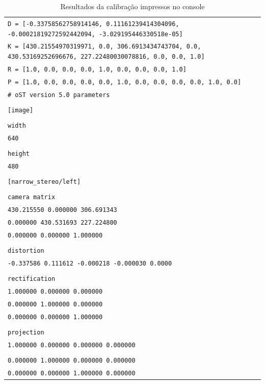 \begin{table}[!ht]\label{tb:5}
\begin{tabular}{| p{\textwidth}|}
\hline
\texttt{D = [-0.33758562758914146, 0.11161239414304096, -0.00021819272592442094, -3.029195446330518e-05]}\\
 \texttt{K = [430.21554970319971, 0.0, 306.6913434743704, 0.0, 430.53169252696676, 227.22480030078816, 0.0, 0.0, 1.0{]}}\\
\texttt{R = [1.0, 0.0, 0.0, 0.0, 1.0, 0.0, 0.0, 0.0, 1.0{]}}\\
\texttt{P = [1.0, 0.0, 0.0, 0.0, 0.0, 1.0, 0.0, 0.0, 0.0, 0.0, 1.0, 0.0]}\\
 \texttt{\# oST version 5.0 parameters}\\
\\
 \texttt{[image]}\\
\\
 \texttt{width}\\
 \texttt{640}\\
\\
 \texttt{height}\\
 \texttt{480}\\
\\
 \texttt{[narrow\_stereo/left]}\\
\\
 \texttt{camera matrix}\\
 \texttt{430.215550 0.000000 306.691343}\\
 \texttt{0.000000 430.531693 227.224800}\\
 \texttt{0.000000 0.000000 1.000000}\\
\\
 \texttt{distortion}\\
 \texttt{-0.337586 0.111612 -0.000218 -0.000030 0.0000}\\
\\
 \texttt{rectification}\\
 \texttt{1.000000 0.000000 0.000000}\\
 \texttt{0.000000 1.000000 0.000000}\\
 \texttt{0.000000 0.000000 1.000000}\\
\\
 \texttt{projection}\\
 \texttt{1.000000 0.000000 0.000000 0.000000}\\
\\
 \texttt{0.000000 1.000000 0.000000 0.000000}\\
 \texttt{0.000000 0.000000 1.000000 0.000000}\\
\hline
\end{tabular}
\caption{Resultados da calibração impressos no console}
\end{table}

